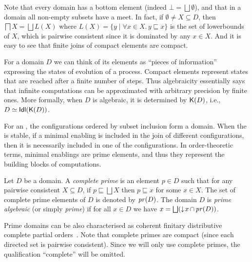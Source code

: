 Note that every domain has a bottom element (indeed $\bot = \bigsqcup \emptyset$), and that
in a domain all non-empty subsets have a meet. In fact, if
$\emptyset \neq X \subseteq D$, then $\bigsqcap X = \bigsqcup L(X)$
where $L(X) = \{ y \mid \forall x \in X.\, y \sqsubseteq x\}$ is the
set of lowerbounds of $X$, which is pairwise consistent since it is
dominated by any $x \in X$. And it is easy to see that finite joins of 
compact elements are compact.

For a domain $D$ we can think of its elements as ``pieces of
information'' expressing the states of evolution of a process. Compact
elements represent states that are reached after a finite number of
steps.  Thus algebraicity essentially says that infinite
computations can be approximated with arbitrary precision by finite
ones. More formally, when $D$ is algebraic, it is determined by
$\mathop{\mathsf{K}({D})}$, i.e., $D \simeq \mathsf{Idl}({\mathop{\mathsf{K}({D})}})$.

For an {\esabbr}, the configurations ordered by subset inclusion form
a domain. When the {\esabbr} is stable, if a minimal
enabling is included in the join of different configurations, then it is necessarily included in one of the configurations. In
order-theoretic terms, minimal enablings are prime elements, and thus
they represent the building blocks of computations.

\begin{definition} Let $D$ be a domain.
  A \emph{complete prime} is an element $p \in D$
  such that for any pairwise consistent $X \subseteq D$, if
  $p \sqsubseteq \bigsqcup X$ then $p \sqsubseteq x$ for some
  $x \in X$.
  The set of complete prime elements of $D$ is denoted by $\mathop{\mathit{pr}({D})}$. 
  The domain $D$ is \emph{prime algebraic} (or simply \emph{prime}) 
  if for all $x \in D$ we have
  $x = \bigsqcup (\mathop{\downarrow\!{x}} \cap \mathop{\mathit{pr}({D})})$.
\end{definition}

Prime domains can be also characterised as coherent finitary distributive complete partial orders~\cite{Win:ES}.
%
Note that complete primes are compact (since each directed set is pairwise
consistent). Since we will only use complete primes, the qualification ``complete'' will be omitted.

